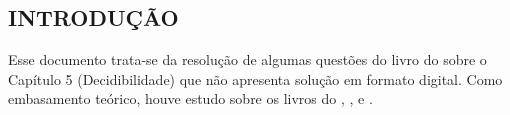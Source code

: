 
\subsection*{INTRODUÇÃO}
Esse documento trata-se da resolução de algumas questões do livro do  sobre o Capítulo 5 (Decidibilidade) que não apresenta solução em formato digital. Como embasamento teórico, houve estudo sobre os livros do , , e .